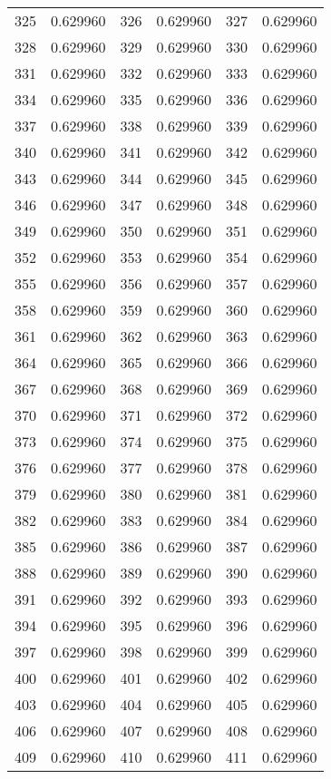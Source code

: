 \documentclass[12pt]{article}
\begin{document}
\begin{longtable}{@{}cc|cc|cc@{}}
325 & 0.629960 & 326 & 0.629960 & 327 & 0.629960 \\
328 & 0.629960 & 329 & 0.629960 & 330 & 0.629960 \\
331 & 0.629960 & 332 & 0.629960 & 333 & 0.629960 \\
334 & 0.629960 & 335 & 0.629960 & 336 & 0.629960 \\
337 & 0.629960 & 338 & 0.629960 & 339 & 0.629960 \\
340 & 0.629960 & 341 & 0.629960 & 342 & 0.629960 \\
343 & 0.629960 & 344 & 0.629960 & 345 & 0.629960 \\
346 & 0.629960 & 347 & 0.629960 & 348 & 0.629960 \\
349 & 0.629960 & 350 & 0.629960 & 351 & 0.629960 \\
352 & 0.629960 & 353 & 0.629960 & 354 & 0.629960 \\
355 & 0.629960 & 356 & 0.629960 & 357 & 0.629960 \\
358 & 0.629960 & 359 & 0.629960 & 360 & 0.629960 \\
361 & 0.629960 & 362 & 0.629960 & 363 & 0.629960 \\
364 & 0.629960 & 365 & 0.629960 & 366 & 0.629960 \\
367 & 0.629960 & 368 & 0.629960 & 369 & 0.629960 \\
370 & 0.629960 & 371 & 0.629960 & 372 & 0.629960 \\
373 & 0.629960 & 374 & 0.629960 & 375 & 0.629960 \\
376 & 0.629960 & 377 & 0.629960 & 378 & 0.629960 \\
379 & 0.629960 & 380 & 0.629960 & 381 & 0.629960 \\
382 & 0.629960 & 383 & 0.629960 & 384 & 0.629960 \\
385 & 0.629960 & 386 & 0.629960 & 387 & 0.629960 \\
388 & 0.629960 & 389 & 0.629960 & 390 & 0.629960 \\
391 & 0.629960 & 392 & 0.629960 & 393 & 0.629960 \\
394 & 0.629960 & 395 & 0.629960 & 396 & 0.629960 \\
397 & 0.629960 & 398 & 0.629960 & 399 & 0.629960 \\
400 & 0.629960 & 401 & 0.629960 & 402 & 0.629960 \\
403 & 0.629960 & 404 & 0.629960 & 405 & 0.629960 \\
406 & 0.629960 & 407 & 0.629960 & 408 & 0.629960 \\
409 & 0.629960 & 410 & 0.629960 & 411 & 0.629960 \\

\end{longtable}
\end{document}
